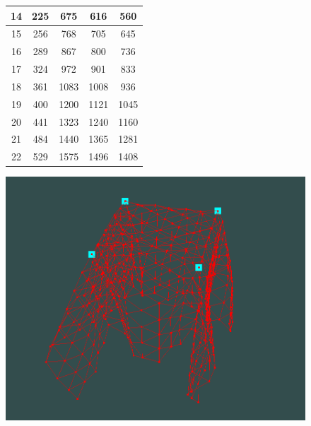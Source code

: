 \documentclass[letterpaper, 10 pt, conference]{ieeeconf}  %
\begin{document}
\begin{figure}
\begin{minipage}[b]{.45\linewidth}
\begin{tabular}{|c|c|c|c|c|}
                14                   & 225                  & 675                 & 616                 & 560                  \\ \hline
                15                   & 256                  & 768                 & 705                 & 645                  \\ \hline
                16                   & 289                  & 867                 & 800                 & 736                  \\ \hline
                17                   & 324                  & 972                 & 901                 & 833                  \\ \hline
                18                   & 361                  & 1083                & 1008                & 936                  \\ \hline
                19                   & 400                  & 1200                & 1121                & 1045                 \\ \hline
                20                   & 441                  & 1323                & 1240                & 1160                 \\ \hline
                21                   & 484                  & 1440                & 1365                & 1281                 \\ \hline
                22                   & 529                  & 1575                & 1496                & 1408                 \\ \hline
                \end{tabular}
                 \label{fig:plateproperties} 
        \end{minipage}
        \begin{minipage}[b]{.45\linewidth}
                \centering
                \includegraphics[width=1.0\linewidth]{tablecloth.png}

\end{minipage}
\end{figure}
\end{document}

